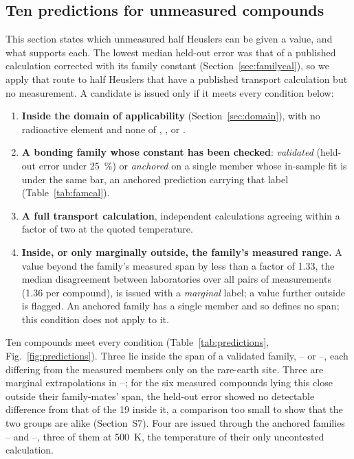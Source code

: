 \subsection{Ten predictions for unmeasured compounds}
\label{sec:screening}
\label{sec:issued}

This section states which unmeasured half Heuslers can be given a value, and what supports each.
The lowest median held-out error was that of a published calculation corrected with its family constant
(Section~\ref{sec:familycal}), so we apply that route to half Heuslers that have a published
transport calculation but no measurement. A candidate
is issued only if it meets every condition below:
\begin{enumerate}
  \item \textbf{Inside the domain of applicability} (Section~\ref{sec:domain}), with no radioactive
        element and none of , ,  or .
  \item \textbf{A bonding family whose constant has been checked}: \emph{validated} (held-out error
        under \SI{25}{\percent}) or \emph{anchored} on a single member whose in-sample fit is under
        the same bar, an anchored prediction carrying that label (Table~\ref{tab:famcal}).
  \item \textbf{A full transport calculation}, independent calculations agreeing within a factor of
        two at the quoted temperature.
  \item \textbf{Inside, or only marginally outside, the family's measured range.} A value beyond the
        family's measured span by less than a factor of \num{1.33}, the median disagreement between
        laboratories over all pairs of measurements (\num{1.36} per compound), is issued with a
        \emph{marginal} label; a value further outside is flagged.
        An anchored family has a single member and so defines no span; this condition does not apply
        to it.
\end{enumerate}

Ten compounds meet every condition (Table~\ref{tab:predictions}, Fig.~\ref{fig:predictions}). Three
lie inside the span of a validated family, -- or --, each differing from
the measured members only on the rare-earth site. Three are marginal extrapolations in
--; for the six measured compounds lying this close outside their family-mates' span,
the held-out error showed no detectable difference from that of the \num{19} inside it, a comparison
too small to show that the two groups are alike (Section~S7). Four are issued through the
anchored families -- and --, three of them at \SI{500}{\kelvin}, the
temperature of their only uncontested calculation.


